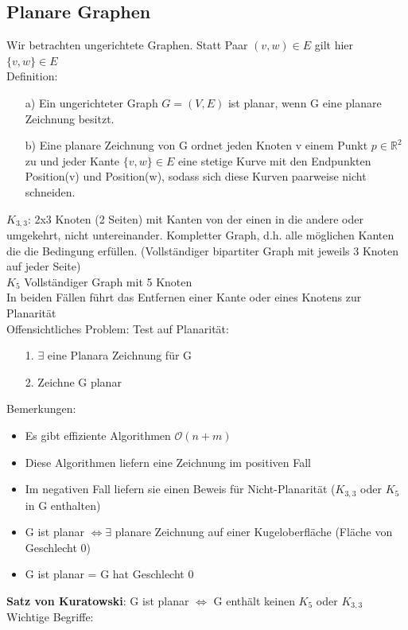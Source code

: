 \documentclass[a4paper]{article}
\newcommand{\oh}[1]{$\mathcal{O}(#1)$}
\begin{document}
\subsection*{Planare Graphen}
Wir betrachten ungerichtete Graphen. Statt Paar $(v,w)\in E $ gilt hier $\{v,w\}\in E$\\
Definition: 
\begin{itemize}
\item[a)]Ein ungerichteter Graph $G=(V,E)$ ist planar, wenn G eine planare Zeichnung besitzt.
\item[b)]Eine planare Zeichnung von G ordnet jeden Knoten v einem Punkt $p\in \mathbb{R}^2$ zu und jeder Kante $\{v,w\}\in E $ eine stetige Kurve mit den Endpunkten Position(v) und Position(w), sodass sich diese Kurven paarweise nicht schneiden.
\end{itemize}
$K_{3,3}$: 2x3 Knoten (2 Seiten) mit Kanten von der einen in die andere oder umgekehrt, nicht untereinander. Kompletter Graph, d.h. alle möglichen Kanten die die Bedingung erfüllen. (Vollständiger bipartiter Graph mit jeweils 3 Knoten auf jeder Seite)\\
$K_5$ Vollständiger Graph mit 5 Knoten\\
In beiden Fällen führt das Entfernen einer Kante oder eines Knotens zur Planarität\\
Offensichtliches Problem: Test auf Planarität:\begin{itemize}
\item[1.]$\exists$ eine Planara Zeichnung für G
\item[2.]Zeichne G planar
\end{itemize}
Bemerkungen:\begin{itemize}
\item Es gibt effiziente Algorithmen \oh{n+m} 
\item Diese Algorithmen liefern eine Zeichnung im positiven Fall
\item Im negativen Fall liefern sie einen Beweis für Nicht-Planarität ($K_{3,3}$ oder $K_5$ in G enthalten)
\item G ist planar $\Leftrightarrow \exists$ planare Zeichnung auf einer Kugeloberfläche (Fläche von Geschlecht 0)
\item G ist planar = G hat Geschlecht 0
\end{itemize}
\textbf{Satz von Kuratowski}: G ist planar $\Leftrightarrow$ G enthält keinen $K_5$ oder $K_{3,3}$\\
Wichtige Begriffe:
\end{document}
